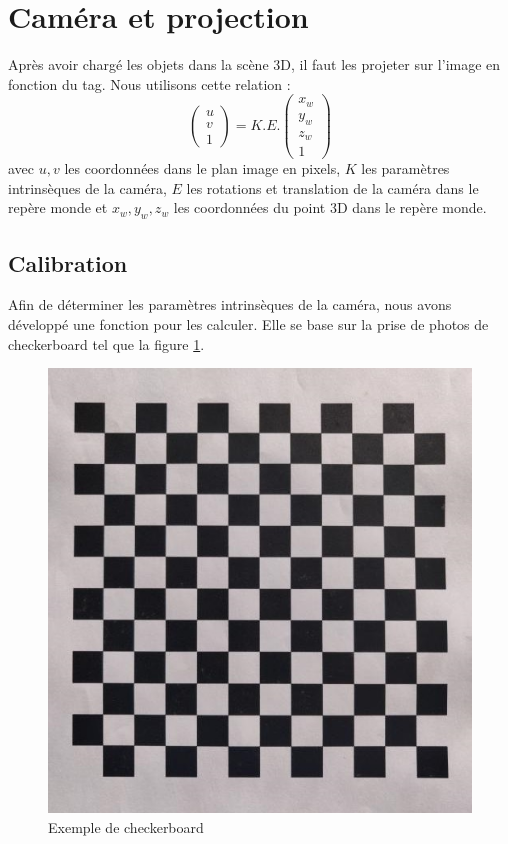     \section{Caméra et projection}
        Après avoir chargé les objets dans la scène 3D, il faut les projeter sur l'image en fonction du tag. Nous utilisons cette relation :
        \begin{equation*}
            \begin{pmatrix}
                u \\ v \\ 1
            \end{pmatrix}
            = K.E.
            \begin{pmatrix}
                x_w \\ y_w \\ z_w \\ 1
            \end{pmatrix}
        \end{equation*}
        avec $u,v$ les coordonnées dans le plan image en pixels, $K$ les paramètres intrinsèques de la caméra, $E$ les rotations et translation de la caméra dans le repère monde et $x_w, y_w, z_w$ les coordonnées du point 3D dans le repère monde.

        \subsection{Calibration}
            Afin de déterminer les paramètres intrinsèques de la caméra, nous avons développé une fonction pour les calculer. Elle se base sur la prise de photos de checkerboard tel que la figure \ref{fig:checkerboard}.

            \begin{figure}[!h]
                \centering
                \includegraphics[scale=0.3]{img/rendu/checkerboard.jpg}
                \caption{Exemple de checkerboard}
                \label{fig:checkerboard}
            \end{figure}

